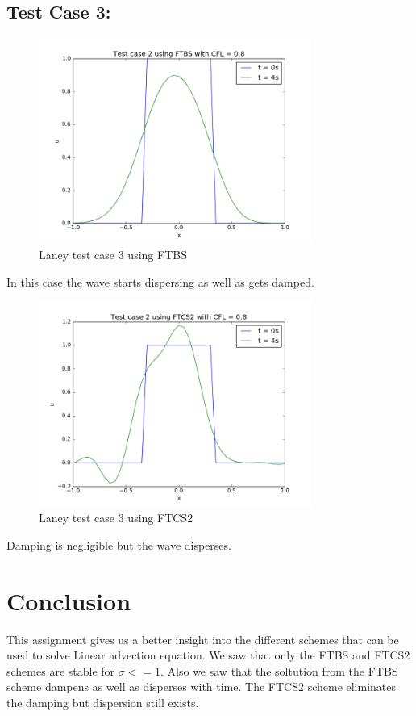 \documentclass[11pt, a4paper]{article}
\begin{document}
\subsection{Test Case 3:}
\begin{figure}
 \centering
 \includegraphics[width = 0.8\textwidth]{laney_t2_bs_1.png}
 \caption{Laney test case 3 using FTBS}
\end{figure}
In this case the wave starts dispersing as well as gets damped. 

\begin{figure}
 \centering
 \includegraphics[width = 0.8\textwidth]{laney_t2_cs2_1.png}
 \caption{Laney test case 3 using FTCS2}
\end{figure}
Damping is negligible but the wave disperses.


\section{Conclusion}

This assignment gives us a better insight into the different schemes that can be used to solve Linear advection equation.
We saw that only the FTBS and FTCS2 schemes are stable for $\sigma <= 1$. Also we saw that the soltution from the FTBS scheme 
dampens as well as disperses with time. The FTCS2 scheme eliminates the damping but dispersion still exists.
\end{document}
